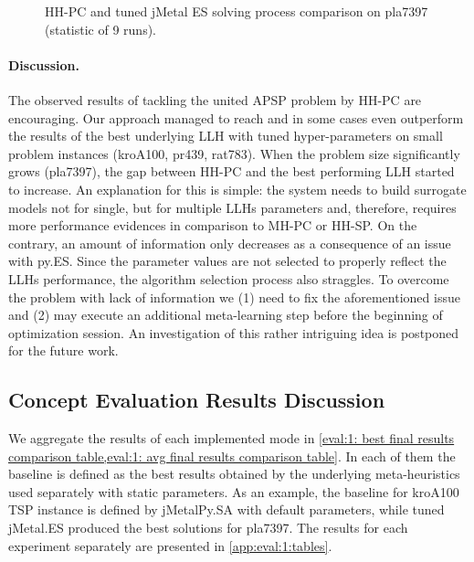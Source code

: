 \begin{figure}[h]
	\centering
	\vspace{-5pt}
	
	\caption{HH-PC and tuned jMetal ES solving process comparison on pla7397 (statistic of 9 runs).}
	\vspace{-5pt}
	\label{eval:pict:hh-pc vs jES on pla7397 process}
\end{figure}

\paragraph{Discussion.} The observed results of tackling the united APSP problem by HH-PC are encouraging. Our approach managed to reach and in some cases even outperform the results of the best underlying LLH with tuned hyper-parameters on small problem instances (kroA100, pr439, rat783). When the problem size significantly grows (pla7397), the gap between HH-PC and the best performing LLH started to increase. An explanation for this is simple: the system needs to build surrogate models not for single, but for multiple LLHs parameters and, therefore, requires more performance evidences in comparison to MH-PC or HH-SP. On the contrary, an amount of information only decreases as a consequence of an issue with py.ES. Since the parameter values are not selected to properly reflect the LLHs performance, the algorithm selection process also straggles. To overcome the problem with lack of information we (1) need to fix the aforementioned issue and (2) may execute an additional meta-learning step before the beginning of optimization session. An investigation of this rather intriguing idea is postponed for the future work.


\subsection{Concept Evaluation Results Discussion}
We aggregate the results of each implemented mode in \cref{eval:1: best final results comparison table,eval:1: avg final results comparison table}. In each of them the baseline is defined as the best results obtained by the underlying meta-heuristics used separately with static parameters. As an example, the baseline for kroA100 TSP instance is defined by jMetalPy.SA with default parameters, while tuned jMetal.ES produced the best solutions for pla7397. The results for each experiment separately are presented in \cref{app:eval:1:tables}.

